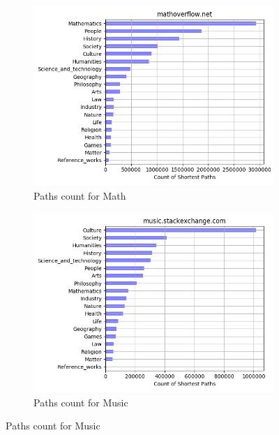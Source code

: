  \begin{figure}[H]
 \ContinuedFloat
    \centering
    \begin{subfigure}{0.5\textwidth}
    \centering
        \includegraphics[width=1\linewidth]{imgs/path-counts/mathoverflow_net}
        \caption{Paths count for Math}
        \label{fig:path-count-math}
    \end{subfigure}%
    \begin{subfigure}{0.5\textwidth}
    \centering
        \includegraphics[width=1\linewidth]{imgs/path-counts/music_stackexchange_com}
        \caption{Paths count for Music}
        \label{fig:path-count-music}
    \end{subfigure}
 

\end{figure}

